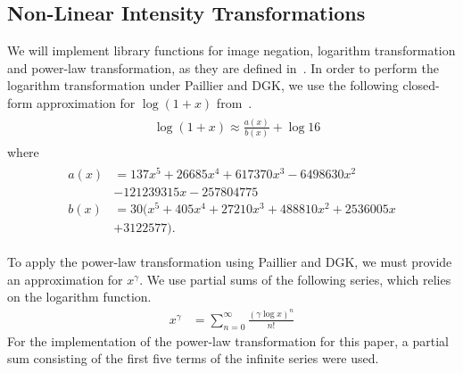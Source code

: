 \subsection{Non-Linear Intensity Transformations}
We will implement library functions for image negation, logarithm transformation and power-law transformation, as they are defined in~\cite{gonzalez_digital_2008}.
In order to perform the logarithm transformation under Paillier and DGK, we use the following closed-form approximation for $\log\left(1 + x\right)$ from~\cite{pcsc-paper}.
\begin{align}\label{eq:optimal_log_approximation}
	\begin{split}
		&\log\left(1+x\right) \approx \frac{a(x)}{b(x)} + \log{16}
	\end{split}
\end{align}
where
\begin{align*}
	\begin{split}
	a(x) &= 137x^5 + 26685x^4 + 617370x^3 - 6498630x^2 \\
	&- 121239315x - 257804775\\
	b(x) &= 30(x^5 + 405x^4 + 27210x^3 + 488810x^2 + 2536005x \\
	&+ 3122577).
	\end{split}
\end{align*}

To apply the power-law transformation using Paillier and DGK, we must provide an approximation for $x^\gamma$.
We use partial sums of the following series, which relies on the logarithm function.
\begin{align}
	x^\gamma &= \sum_{n=0}^{\infty}{\frac{(\gamma\log{x})^n}{n!}}
\end{align}
For the implementation of the power-law transformation for this paper, a partial sum consisting of the first five terms of the infinite series were used.

